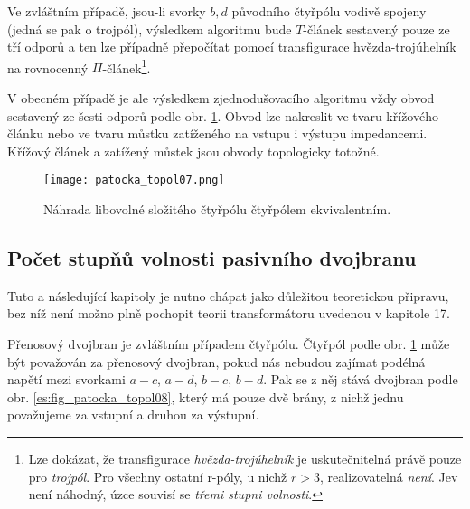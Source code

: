       Ve zvláštním případě, jsou-li svorky \(b, d\) původního čtyřpólu vodivě spojeny (jedná se pak 
      o trojpól), výsledkem algoritmu bude \(T\)-článek sestavený pouze ze tří odporů a ten lze 
      případně přepočítat pomocí transfigurace hvězda-trojúhelník na rovnocenný 
      \(\Pi\)-článek\footnote{Lze dokázat, že transfigurace \emph{hvězda-trojúhelník} je 
      uskutečnitelná právě pouze pro \emph{trojpól}. Pro všechny ostatní r-póly, u nichž \(r > 3\), 
      realizovatelná \emph{není}. Jev není náhodný, úzce souvisí se \emph{třemi stupni volnosti}.}.
      
      V obecném případě je ale výsledkem zjednodušovacího algoritmu vždy obvod sestavený ze šesti 
      odporů podle obr. \ref{es:fig_patocka_topol07}. Obvod lze nakreslit ve tvaru křížového článku 
      nebo ve tvaru můstku zatíženého na vstupu i výstupu impedancemi. Křížový článek a zatížený 
      můstek jsou obvody topologicky totožné.
      \begin{figure}[ht!]
        \centering  
        \texttt{[image: patocka\_topol07.png]}
        \caption{Náhrada libovolné složitého čtyřpólu čtyřpólem ekvivalentním.
                \cite[s.~48]{Patocka4}} 
        \label{es:fig_patocka_topol07}
      \end{figure}
      
    \subsection{Počet stupňů volnosti pasivního dvojbranu}\label{teo:IchapIIIsecIsubVI}
      Tuto a následující kapitoly je nutno chápat jako důležitou teoretickou připravu, bez níž není 
      možno plně pochopit teorii transformátoru uvedenou v kapitole 17.
      
      Přenosový dvojbran je zvláštním případem čtyřpólu. Čtyř\-pól podle obr. 
      \ref{es:fig_patocka_topol07} může být považován za přenosový dvojbran, pokud nás nebudou 
      zajímat podélná napětí mezi svorkami \(a-c\), \(a-d\), \(b-c\), \(b-d\). Pak se z něj stává 
      dvojbran podle obr. \ref{es:fig_patocka_topol08}, který má pouze dvě brány, z nichž jednu 
      považujeme za vstupní a druhou za výstupní.
      
